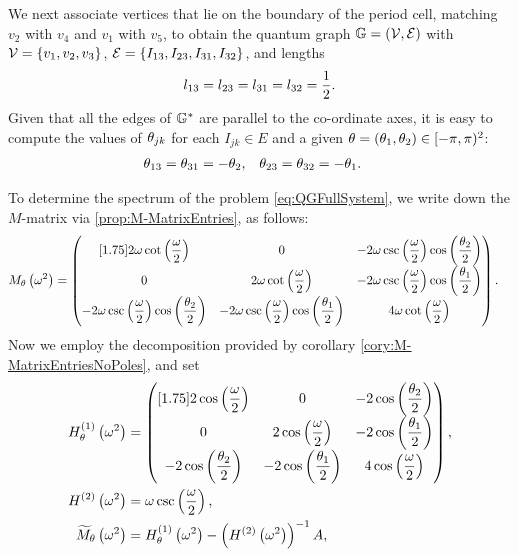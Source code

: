 We next associate vertices that lie on the boundary of the period cell, matching $v_2$ with $v_4$ and $v_1$ with $v_5$, to obtain the quantum graph $\mathbb{G}=\left( \mathcal{V},\mathcal{E} \right)$ with $\mathcal{V}=\left\{ v_1,v_2,v_3 \right\}$, $\mathcal{E}=\left\{ I_{13},I_{23},I_{31},I_{32} \right\}$, and lengths
\begin{align*}
	l_{13} = l_{23} = l_{31} = l_{32} = \frac{1}{2}.
\end{align*}
Given that all the edges of $\mathbb{G}^*$ are parallel to the co-ordinate axes, it is easy to compute the values of $\theta_{jk}$ for each $I_{jk}\in E$ and a given $\theta=\left( \theta_1,\theta_2 \right)\in[-\pi,\pi)^2$:
\begin{align*}
	\theta_{13} = \theta_{31} = -\theta_2, &\quad \theta_{23} = \theta_{32} = -\theta_1.
\end{align*}

To determine the spectrum of the problem \eqref{eq:QGFullSystem}, we write down the $M$-matrix via \ref{prop:M-MatrixEntries}, as follows: 
\begin{align*}
	M_{\theta}\left( \omega^2 \right) &=
	\begin{pmatrix}[1.75]
		2\omega\cot\left( \dfrac{\omega}{2} \right) & 0 & -2\omega\csc\left( \dfrac{\omega}{2} \right)\cos\left( \dfrac{\theta_2}{2} \right) \\
		0 & 2\omega\cot\left( \dfrac{\omega}{2} \right) & -2\omega\csc\left( \dfrac{\omega}{2} \right)\cos\left( \dfrac{\theta_1}{2} \right) \\
		-2\omega\csc\left( \dfrac{\omega}{2} \right)\cos\left( \dfrac{\theta_2}{2} \right) & -2\omega\csc\left( \dfrac{\omega}{2} \right)\cos\left( \dfrac{\theta_1}{2} \right) & 4\omega\cot\left( \dfrac{\omega}{2} \right)
	\end{pmatrix}.
\end{align*}
Now we employ the decomposition provided by corollary \ref{cory:M-MatrixEntriesNoPoles}, and set
\begin{align*}
	H_\theta^{(1)}\left( \omega^2 \right) &=
	\begin{pmatrix}[1.75]
		2\cos\left( \dfrac{\omega}{2} \right) & 0 & -2\cos\left( \dfrac{\theta_2}{2} \right) \\
		0 & 2\cos\left( \dfrac{\omega}{2} \right) & -2\cos\left( \dfrac{\theta_1}{2} \right) \\
		-2\cos\left( \dfrac{\theta_2}{2} \right) & -2\cos\left( \dfrac{\theta_1}{2} \right) & 4\cos\left( \dfrac{\omega}{2} \right)
	\end{pmatrix}, \\
	H^{(2)}\left( \omega^2 \right) &= \omega\csc\left( \frac{\omega}{2} \right), \\
	\widetilde{M}_\theta\left( \omega^2 \right) &= H_\theta^{(1)}\left( \omega^2 \right) - \left( H^{(2)}\left( \omega^2 \right) \right)^{-1}A,
\end{align*}
